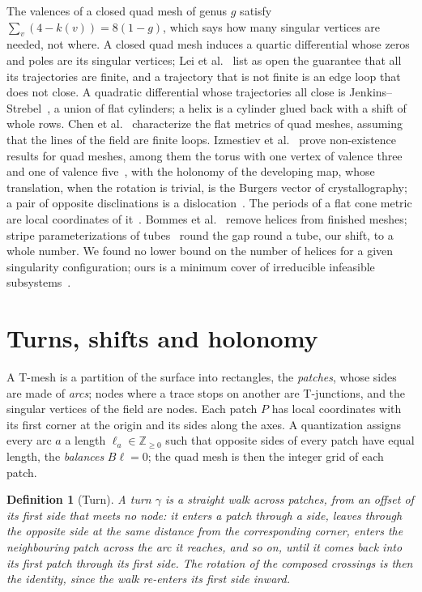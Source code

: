 \documentclass[11pt,a4paper]{article}
\newtheorem{definition}{Definition}
\newcommand{\Z}{\mathbb{Z}}
\begin{document}
The valences of a closed quad mesh of genus $g$ satisfy $\sum_v (4 - k(v)) = 8(1-g)$,
which says how many singular vertices are needed, not where. A closed quad mesh induces a quartic differential
whose zeros and poles are its singular vertices; Lei et
al.~\cite{lei2020quartic} list as open the guarantee that all its
trajectories are finite, and a trajectory that is not finite is an edge loop
that does not close. A quadratic
differential whose trajectories all close is
Jenkins--Strebel~\cite{strebel1984quadratic}, a union of flat cylinders; a
helix is a cylinder glued back with a shift of whole rows. Chen et
al.~\cite{chen2019metric} characterize the flat metrics of quad meshes,
assuming that the lines of the field are finite loops. Izmestiev et al.~\cite{izmestiev2013torus} prove non-existence results for quad meshes,
among them the torus with one vertex of valence three and one of valence
five~\cite{barnette1971toroidal}, with the holonomy of the developing map,
whose translation, when the rotation is trivial, is the Burgers vector of
crystallography; a pair of opposite disclinations is a
dislocation~\cite{kleman2008disclinations}. The periods of a flat cone metric
are local coordinates of it~\cite{thurston1998shapes,veech1993flat}. Bommes et
al.~\cite{bommes2011structure} remove helices from finished meshes; stripe
parameterizations of tubes~\cite{kalberer2011stripe} round the gap round a
tube, our shift, to a whole number. We found no lower bound on the number of helices for a given
singularity configuration; ours is a minimum cover of irreducible infeasible
subsystems~\cite{parker1996iis,amaldi2003maxfs}.

\section{Turns, shifts and holonomy}\label{sec:setting}

A T-mesh is a partition of the surface into rectangles, the \emph{patches},
whose sides are made of \emph{arcs}; nodes where a trace stops on another are
T-junctions, and the singular vertices of the field are nodes. Each patch $P$
has local coordinates with its first corner at the origin and its sides along
the axes. A quantization assigns every arc $a$ a length $\ell_a \in \Z_{\ge
0}$ such that opposite sides of every patch have equal length, the
\emph{balances} $B\ell = 0$; the quad mesh is then the integer grid of each
patch.

\begin{definition}[Turn]
A \emph{turn} $\gamma$ is a straight walk across patches, from an offset of
its first side that meets no node: it enters a patch through a side, leaves
through the opposite side at the same distance from the corresponding corner,
enters the neighbouring patch across the arc it reaches, and so on, until it
comes back into its first patch through its first side. The rotation of the
composed crossings is then the identity, since the walk re-enters its first
side inward.
\end{definition}
\end{document}
